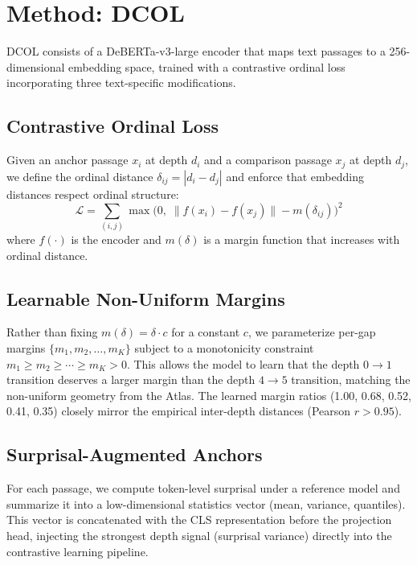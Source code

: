 \documentclass[11pt,a4paper]{article}
\newcommand{\ours}{DCOL}
\newcommand{\atlas}{Atlas}
\begin{document}
\section{Method: \ours{}}
\label{sec:method}

\ours{} consists of a DeBERTa-v3-large encoder that maps text passages to a 256-dimensional embedding space, trained with a contrastive ordinal loss incorporating three text-specific modifications.

\subsection{Contrastive Ordinal Loss}
\label{sec:loss}

Given an anchor passage $x_i$ at depth $d_i$ and a comparison passage $x_j$ at depth $d_j$, we define the ordinal distance $\delta_{ij} = |d_i - d_j|$ and enforce that embedding distances respect ordinal structure:
\begin{equation}
\mathcal{L} = \sum_{(i,j)} \max\bigl(0,\; \|f(x_i) - f(x_j)\| - m(\delta_{ij})\bigr)^2
\end{equation}
where $f(\cdot)$ is the encoder and $m(\delta)$ is a margin function that increases with ordinal distance.

\subsection{Learnable Non-Uniform Margins}
\label{sec:margins}

Rather than fixing $m(\delta) = \delta \cdot c$ for a constant $c$, we parameterize per-gap margins $\{m_1, m_2, \ldots, m_{K}\}$ subject to a monotonicity constraint $m_1 \ge m_2 \ge \cdots \ge m_K > 0$.
This allows the model to learn that the depth $0{\to}1$ transition deserves a larger margin than the depth $4{\to}5$ transition, matching the non-uniform geometry from the \atlas{}.
The learned margin ratios (1.00, 0.68, 0.52, 0.41, 0.35) closely mirror the empirical inter-depth distances (Pearson $r > 0.95$).

\subsection{Surprisal-Augmented Anchors}
\label{sec:anchors}

For each passage, we compute token-level surprisal under a reference model and summarize it into a low-dimensional statistics vector (mean, variance, quantiles).
This vector is concatenated with the CLS representation before the projection head, injecting the strongest depth signal (surprisal variance) directly into the contrastive learning pipeline.
\end{document}

